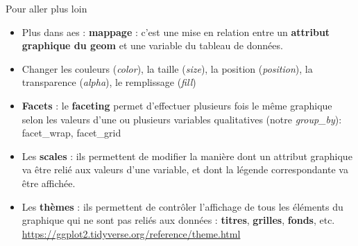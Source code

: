 \documentclass[
  ignorenonframetext,
]{beamer}
\providecommand{\tightlist}{%
  \setlength{\itemsep}{0pt}\setlength{\parskip}{0pt}}
\begin{document}
\begin{frame}{Pour aller plus loin}
\protect\hypertarget{pour-aller-plus-loin}{}
\begin{itemize}[<+->]
\tightlist
\item
  Plus dans aes : \textbf{mappage} : c'est une mise en relation entre un
  \textbf{attribut graphique du geom} et une variable du tableau de
  données.
\item
  Changer les couleurs (\emph{color}), la taille (\emph{size}), la
  position (\emph{position}), la transparence (\emph{alpha}), le
  remplissage (\emph{fill})
\end{itemize}

\begin{itemize}[<+->]
\tightlist
\item
  \textbf{Facets} : le \textbf{faceting} permet d'effectuer plusieurs
  fois le même graphique selon les valeurs d'une ou plusieurs variables
  qualitatives (notre \emph{group\_by}): facet\_wrap, facet\_grid
\end{itemize}

\begin{itemize}[<+->]
\tightlist
\item
  Les \textbf{scales} : ils permettent de modifier la manière dont un
  attribut graphique va être relié aux valeurs d'une variable, et dont
  la légende correspondante va être affichée.
\end{itemize}

\begin{itemize}[<+->]
\tightlist
\item
  Les \textbf{thèmes} : ils permettent de contrôler l'affichage de tous
  les éléments du graphique qui ne sont pas reliés aux données :
  \textbf{titres}, \textbf{grilles}, \textbf{fonds}, etc.
  \url{https://ggplot2.tidyverse.org/reference/theme.html}
\end{itemize}
\end{frame}
\end{document}
